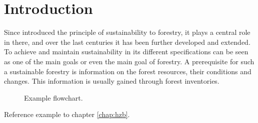 \chapter{Introduction}
\label{chap:Introduction}
Since \citet{Carlowitz_1713} introduced the principle of sustainability to forestry, it plays a central role in there, and over the last centuries it has been further developed and extended. To achieve and maintain sustainability in its different specifications \citep{Speidel_1984, Schanz_1996} can be seen as one of the main goals or even the main goal of forestry. A prerequisite for such a sustainable forestry is information on the forest resources, their conditions and changes. This information is usually gained through forest inventories.


\begin{figure}
	\center
	\resizebox{0.7\linewidth}{!}{}
	\caption{Example flowchart.}
	\label{fig:Introduction:flowopt}
\end{figure}


Reference example to chapter \ref{chap:hzb}.
